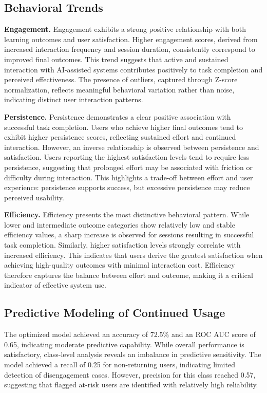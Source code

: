 \documentclass{article}
\begin{document}
\subsection{Behavioral Trends}

\textbf{Engagement.}
Engagement exhibits a strong positive relationship with both learning outcomes and user satisfaction. Higher engagement scores, derived from increased interaction frequency and session duration, consistently correspond to improved final outcomes. This trend suggests that active and sustained interaction with AI-assisted systems contributes positively to task completion and perceived effectiveness. The presence of outliers, captured through Z-score normalization, reflects meaningful behavioral variation rather than noise, indicating distinct user interaction patterns.

\textbf{Persistence.}
Persistence demonstrates a clear positive association with successful task completion. Users who achieve higher final outcomes tend to exhibit higher persistence scores, reflecting sustained effort and continued interaction. However, an inverse relationship is observed between persistence and satisfaction. Users reporting the highest satisfaction levels tend to require less persistence, suggesting that prolonged effort may be associated with friction or difficulty during interaction. This highlights a trade-off between effort and user experience: persistence supports success, but excessive persistence may reduce perceived usability.

\textbf{Efficiency.}
Efficiency presents the most distinctive behavioral pattern. While lower and intermediate outcome categories show relatively low and stable efficiency values, a sharp increase is observed for sessions resulting in successful task completion. Similarly, higher satisfaction levels strongly correlate with increased efficiency. This indicates that users derive the greatest satisfaction when achieving high-quality outcomes with minimal interaction cost. Efficiency therefore captures the balance between effort and outcome, making it a critical indicator of effective system use.


\subsection{Predictive Modeling of Continued Usage}

The optimized model achieved an accuracy of 72.5\% and an ROC AUC score of 0.65, indicating moderate predictive capability. While overall performance is satisfactory, class-level analysis reveals an imbalance in predictive sensitivity. The model achieved a recall of 0.25 for non-returning users, indicating limited detection of disengagement cases. However, precision for this class reached 0.57, suggesting that flagged at-risk users are identified with relatively high reliability.
\end{document}
